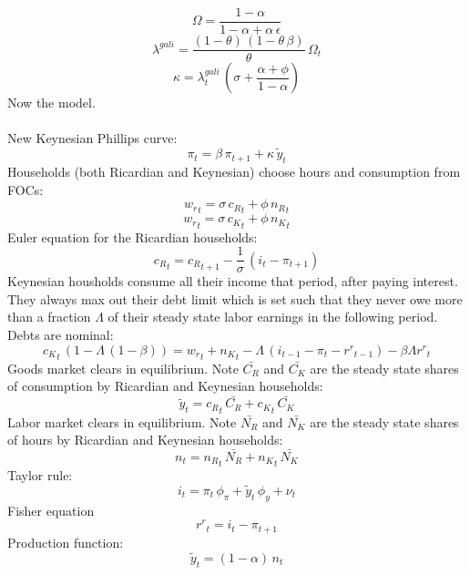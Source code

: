 \documentclass[titlepage]{\econtex}\newcommand{\texname}{ConsumptionHeterogeneity}
\begin{document}
\begin{dmath*}
	\Omega = \frac{1-{\alpha}}{1-{\alpha}+{\alpha}\, {\epsilon}}
\end{dmath*}
\begin{dmath*}
	\lambda^{gali} = \frac{\left(1-{\theta}\right)\, \left(1-{\theta}\, {\beta}\right)}{{\theta}}\, \Omega_{t}
\end{dmath*}
\begin{dmath*}
	\kappa = \lambda^{gali}_{t}\, \left({\sigma}+\frac{{\alpha}+{\phi}}{1-{\alpha}}\right)
\end{dmath*}
Now the model.\\
\\
New Keynesian Phillips curve:
\begin{dmath}
	{\pi}_{t}={\beta}\, {\pi}_{t+1}+\kappa\, {\tilde y}_{t}
\end{dmath}
Households (both Ricardian and Keynesian) choose hours and consumption from FOCs:
\begin{dmath}
	{w_r}_{t}={\sigma}\, {c_R}_{t}+{\phi}\, {n_R}_{t}
\end{dmath}
\begin{dmath}
	{w_r}_{t}={\sigma}\, {c_K}_{t}+{\phi}\, {n_K}_{t}
\end{dmath}
Euler equation for the Ricardian households:
\begin{dmath}
	{c_R}_{t}={c_R}_{t+1}-\frac{1}{{\sigma}}\, \left({i}_{t}-{\pi}_{t+1}\right)
\end{dmath}
Keynesian housholds consume all their income that period, after paying interest. They always max out their debt limit which is set such that they never owe more than a fraction $\Lambda$ of their steady state labor earnings in the following period. Debts are nominal:
\begin{dmath}
	{c_K}_{t}\, \left(1-{\Lambda}\, \left(1-{\beta}\right)\right)={w_r}_{t}+{n_K}_{t}- {\Lambda}\, \left({i}_{t-1}-{\pi}_{t}-{r^r}_{t-1}\right) - {\beta \Lambda}{r^r}_{t}
\end{dmath}
Goods market clears in equilibrium. Note $\bar{C_R}$ and $\bar{C_K}$ are the steady state shares of consumption by Ricardian and Keynesian households:
\begin{dmath}
	{\tilde y}_{t}={c_R}_{t}\, \bar{C_R}+{c_K}_{t}\, \bar{C_K}
\end{dmath}
Labor market clears in equilibrium. Note $\bar{N_R}$ and $\bar{N_K}$ are the steady state shares of hours by Ricardian and Keynesian households:
\begin{dmath}
	{n}_{t}={n_R}_{t}\, \bar{N_R}+{n_K}_{t}\, \bar{N_K}
\end{dmath}
Taylor rule:
\begin{dmath}
	{i}_{t}={\pi}_{t}\, {\phi_{\pi}}+{\tilde y}_{t}\, {\phi_{y}}+{\nu}_{t}
\end{dmath}
Fisher equation
\begin{dmath}
	{r^r}_{t}={i}_{t}-{\pi}_{t+1}
\end{dmath}
Production function:
\begin{dmath}
	{\tilde y}_{t}=\left(1-{\alpha}\right)\, {n}_{t}
\end{dmath}
\end{document}
